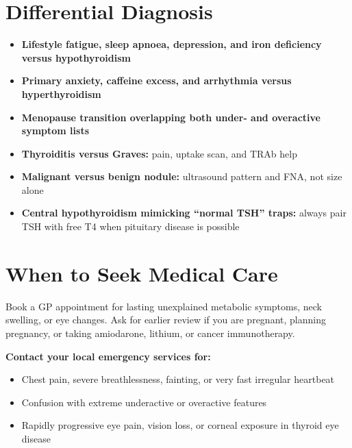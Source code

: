\section*{Differential Diagnosis}
\begin{itemize}
    \item \textbf{Lifestyle fatigue, sleep apnoea, depression, and iron deficiency versus hypothyroidism}
    \item \textbf{Primary anxiety, caffeine excess, and arrhythmia versus hyperthyroidism}
    \item \textbf{Menopause transition overlapping both under- and overactive symptom lists}
    \item \textbf{Thyroiditis versus Graves:} pain, uptake scan, and TRAb help
    \item \textbf{Malignant versus benign nodule:} ultrasound pattern and FNA, not size alone
    \item \textbf{Central hypothyroidism mimicking ``normal TSH'' traps:} always pair TSH with free T4 when pituitary disease is possible
\end{itemize}

\section*{When to Seek Medical Care}
Book a GP appointment for lasting unexplained metabolic symptoms, neck swelling, or eye changes. Ask for earlier review if you are pregnant, planning pregnancy, or taking amiodarone, lithium, or cancer immunotherapy.

\textbf{Contact your local emergency services for:}
\begin{itemize}
    \item Chest pain, severe breathlessness, fainting, or very fast irregular heartbeat
    \item Confusion with extreme underactive or overactive features
    \item Rapidly progressive eye pain, vision loss, or corneal exposure in thyroid eye disease
\end{itemize}

